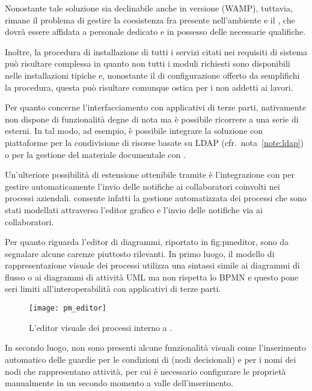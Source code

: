 Nonostante tale soluzione sia declinabile anche in versione  (WAMP), tuttavia, rimane il problema di gestire la coesistenza fra  presente nell'ambiente  e il  , che dovrà essere affidata a personale dedicato e in possesso delle necessarie qualifiche.

Inoltre, la procedura di installazione di tutti i servizi citati nei requisiti di sistema può risultare complessa in quanto non tutti i moduli richiesti sono disponibili nelle installazioni tipiche e, nonostante il  di configurazione offerto da \progname semplifichi la procedura, questa può risultare comunque ostica per i non addetti ai lavori.

Per quanto concerne l'interfacciamento con applicativi di terze parti, \progname nativamente non dispone di funzionalità degne di nota ma è possibile ricorrere a una serie di  esterni. In tal modo, ad esempio, è possibile integrare la soluzione con piattaforme per la condivisione di risorse basate su LDAP (cfr.~nota~\ref{note:ldap}) o per la gestione del materiale documentale con .

Un'ulteriore possibilità di estensione ottenibile tramite  è l'integrazione con  per gestire automaticamente l'invio delle notifiche ai collaboratori coinvolti nei processi aziendali. \progname consente infatti la gestione automatizzata dei processi che sono stati modellati attraverso l'editor grafico e l'invio delle notifiche	via  ai collaboratori.

Per quanto riguarda l'editor di diagrammi, riportato in \figurename{fig:pmeditor}, sono da segnalare alcune carenze piuttosto rilevanti. In primo luogo, il modello di rappresentazione visuale dei processi utilizza una sintassi simile ai diagrammi di flusso o ai diagrammi di attività UML ma non rispetta lo  BPMN e questo pone seri limiti all'interoperabilità con applicativi di terze parti.

\begin{figure}[H]
  \centering
  \texttt{[image: pm\_editor]}
  \caption{L'editor visuale dei processi interno a \progname.}
  \label{fig:pmeditor}
\end{figure}

In secondo luogo, non sono presenti alcune funzionalità visuali come l'inserimento automatico delle guardie per le condizioni di  (nodi decisionali) e per i nomi dei nodi che rappresentano attività, per cui è necessario configurare le proprietà manualmente in un secondo momento a valle dell'inserimento.

